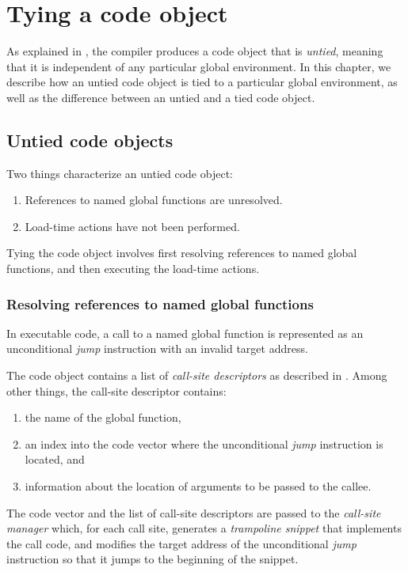 \chapter{Tying a code object}
\label{chap-tying-a-code-object}

As explained in , the compiler produces a code
object  that is
\emph{untied}, meaning that it is independent of any particular global
environment.  In this chapter, we describe how an untied code object
is tied to a particular global environment, as well as the difference
between an untied and a tied code object.

\section{Untied code objects}

Two things characterize an untied code object:

\begin{enumerate}
\item References to named global functions are unresolved.
\item Load-time actions have not been performed.
\end{enumerate}

Tying the code object involves first resolving references to named
global functions, and then executing the load-time actions.

\subsection{Resolving references to named global functions}

In executable code, a call to a named global function is represented
as an unconditional \emph{jump} instruction with an invalid target
address.

The code object contains a list of \emph{call-site descriptors} as
described in .  Among other things,
the call-site descriptor contains:

\begin{enumerate}
\item the name of the global function,
\item an index into the code vector where the unconditional
  \emph{jump} instruction is located, and
\item information about the location of arguments to be passed to the
  callee.
\end{enumerate}

The code vector and the list of call-site descriptors are passed to
the \emph{call-site manager} which, for each call site, generates a
\emph{trampoline snippet} that implements the call code, and modifies
the target address of the unconditional \emph{jump} instruction so
that it jumps to the beginning of the snippet.
